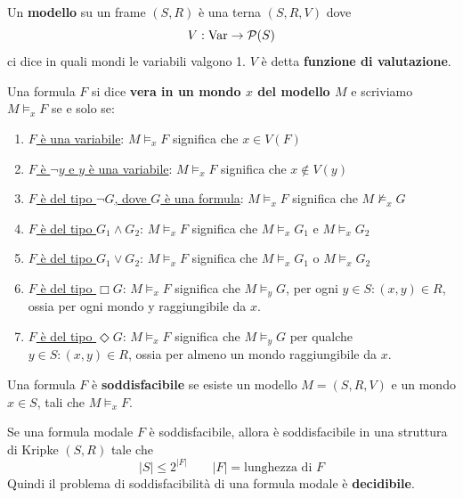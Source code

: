 \documentclass[../main.tex]{subfiles}
\begin{document}
\begin{definition}[Modello]
    Un \textbf{modello} su un frame $(S,R)$ è una terna $(S,R,V)$ dove
    \[
        V : \operatorname{Var} \rightarrow \mathcal{P}(S)
    \]
    ci dice in quali mondi le variabili valgono 1. $V$ è detta \textbf{funzione di valutazione}.
\end{definition}
\begin{definition}
    Una formula $F$ si dice \textbf{vera in un mondo $x$ del modello $M$} e scriviamo $M \vDash_x F$ se e solo se:
    \begin{enumerate}
        \item \underline{$F$ è una variabile}: $M \vDash_x F$ significa che $x \in V(F)$
        \item \underline{$F$ è $\neg y$ e $y$ è una variabile}: $M \vDash_x F$ significa che $x \notin V(y)$
        \item \underline{$F$ è del tipo $\neg G$, dove $G$ è una formula}: $M \vDash_x F$ significa che $M \nvDash_x G$
        \item \underline{$F$ è del tipo $G_1 \land G_2$}: $M \vDash_x F$ significa che $M \vDash_x G_1$ e $M \vDash_x G_2$
        \item \underline{$F$ è del tipo $G_1 \lor G_2$}: $M \vDash_x F$ significa che $M \vDash_x G_1$ o $M \vDash_x G_2$
        \item \underline{$F$ è del tipo $\Box G$}: $M \vDash_x F$ significa che $M \vDash_y G$, per ogni $y \in S : (x,y) \in R$, ossia per ogni mondo y raggiungibile da $x$.
        \item \underline{$F$ è del tipo $\Diamond G$}: $M \vDash_x F$ significa che $M \vDash_y G$ per qualche $y \in S : (x,y) \in R$, ossia per almeno un mondo raggiungibile da $x$.
    \end{enumerate}
\end{definition}
\begin{definition}[Soddisfacibilità]
    Una formula $F$ è \textbf{soddisfacibile} se esiste un modello $M = (S, R, V)$ e un mondo $x \in S$, tali che $M \vDash_x F$.
\end{definition}
\begin{theorem}
    Se una formula modale $F$ è soddisfacibile, allora è soddisfacibile in una struttura di Kripke $(S,R)$ tale che
    \[
        |S| \leq 2^{|F|} \qquad |F| = \text{lunghezza di $F$}
    \]
    Quindi il problema di soddisfacibilità di una formula modale è \textbf{decidibile}.
\end{theorem}
\end{document}

